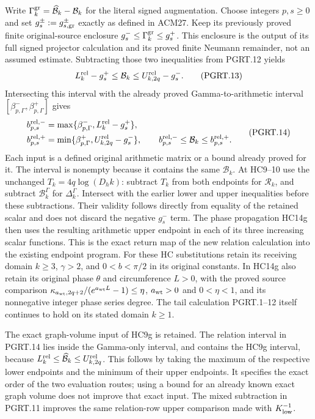 Write $\Gamma_k^{\rm gr}=\widehat{\mathcal B}_k-\mathcal B_k$
for the literal signed augmentation. Choose integers $p,s\geq0$ and
set $g_s^\pm:=g_{s,\rm gr}^\pm$ exactly as defined in ACM27.
Keep its previously proved finite original-source enclosure
$g_s^-\leq\Gamma_k^{\rm gr}\leq g_s^+$. This enclosure is the output of its full signed projector
calculation and its proved finite Neumann remainder, not an assumed
estimate. Subtracting those two inequalities from PGRT.12 yields
\[
 L_k^{\rm rel}-g_s^+\leq\mathcal B_k
                  \leq U_{k,2q}^{\rm rel}-g_s^-.
\tag{PGRT.13}\label{GraphV2:eq:pgrt-arithmetic-return}
\]
Intersecting this interval with the already proved Gamma-to-arithmetic
interval $[\beta_{p,\Gamma}^-,\beta_{p,\Gamma}^+]$ gives
\[
\begin{aligned}
 b_{p,s}^{\rm rel,-}
 &=\max\{\beta_{p,\Gamma}^-,L_k^{\rm rel}-g_s^+\},\\
 b_{p,s}^{\rm rel,+}
 &=\min\{\beta_{p,\Gamma}^+,U_{k,2q}^{\rm rel}-g_s^-\},\qquad
 b_{p,s}^{\rm rel,-}\leq\mathcal B_k\leq b_{p,s}^{\rm rel,+}.
\end{aligned}
\tag{PGRT.14}\label{GraphV2:eq:pgrt-current-interval}
\]
Each input is a defined original arithmetic matrix or a bound already
proved for it. The interval is nonempty because it contains the same
$\mathcal B_k$. At HC9--10 use the unchanged $T_k=4q\log(D_hk)$:
subtract $T_k$ from both endpoints for $\mathcal R_k$, and subtract
$\mathcal B_k^\Gamma$ for $\Delta_k^\Gamma$. Intersect with the
earlier lower and upper inequalities before these subtractions.
Their validity follows directly from equality of the retained scalar
and does not discard the negative $g_s^-$ term. The phase propagation
HC14g then uses the resulting arithmetic upper endpoint in each of
its three increasing scalar functions. This is the exact return map
of the new relation calculation into the existing endpoint program.
For these HC substitutions retain its receiving domain $k\geq3$,
$\gamma>2$, and $0<b<\pi/2$ in its original constants. In HC14g
also retain its original phase $\theta$ and circumference $L>0$,
with the proved source comparison
$\kappa_{a_{\rm wt},2q+2}/(e^{a_{\rm wt}L}-1)\leq\eta$,
$a_{\rm wt}>0$ and $0<\eta<1$, and its nonnegative integer phase
series degree. The tail calculation PGRT.1--12 itself continues
to hold on its stated domain $k\geq1$.

The exact graph-volume input of HC9g is retained. The relation
interval in PGRT.14 lies inside the Gamma-only interval, and
contains the HC9g interval, because
$L_k^{\rm rel}\leq\widehat{\mathcal B}_k\leq U_{k,2q}^{\rm rel}$.
This follows by taking the maximum of the respective lower
endpoints and the minimum of their upper endpoints. It specifies
the exact order of the two evaluation routes; using a bound for
an already known exact graph volume does not improve that exact
input. The mixed subtraction in PGRT.11 improves the same
relation-row upper comparison made with $K_{\rm low}^{-1}$.

